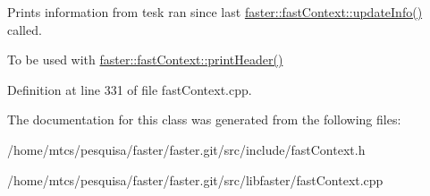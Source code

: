 Prints information from tesk ran since last \hyperlink{classfaster_1_1fastContext_ae6e69c86414bc5333da72aef13257d26}{faster\+::fast\+Context\+::update\+Info()} called. 

To be used with \hyperlink{classfaster_1_1fastContext_a721a0db53e603bff27578e040b616f6f}{faster\+::fast\+Context\+::print\+Header()} 

Definition at line 331 of file fast\+Context.\+cpp.



The documentation for this class was generated from the following files\+:\begin{DoxyCompactItemize}
\item 
/home/mtcs/pesquisa/faster/faster.\+git/src/include/fast\+Context.\+h\item 
/home/mtcs/pesquisa/faster/faster.\+git/src/libfaster/fast\+Context.\+cpp\end{DoxyCompactItemize}
